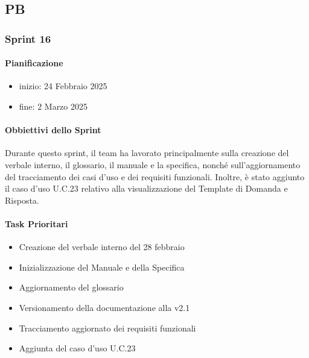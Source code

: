 \documentclass{article}
\begin{document}
        \subsection{PB}
            \subsubsection{Sprint 16}
            \paragraph{Pianificazione}
                \begin{itemize}
                    \item inizio: 24 Febbraio 2025
                    \item fine: 2 Marzo 2025
                \end{itemize}
            
            \paragraph{Obbiettivi dello Sprint}
            Durante questo sprint, il team ha lavorato principalmente sulla creazione del verbale interno, il glossario, il manuale e la specifica, nonché sull'aggiornamento del tracciamento dei casi d’uso e dei requisiti funzionali. Inoltre, è stato aggiunto il caso d’uso U.C.23 relativo alla visualizzazione del Template di Domanda e Risposta.
            
            \paragraph{Task Prioritari}
            \begin{itemize}
                \item Creazione del verbale interno del 28 febbraio
                \item Inizializzazione del Manuale e della Specifica
                \item Aggiornamento del glossario
                \item Versionamento della documentazione alla v2.1
                \item Tracciamento aggiornato dei requisiti funzionali
                \item Aggiunta del caso d’uso U.C.23
            \end{itemize}
            
\end{document}
